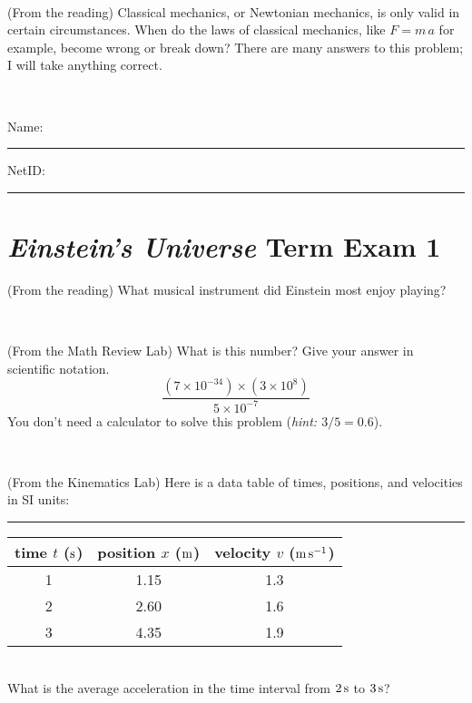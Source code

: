 \documentclass[12pt, letterpaper]{article}
\begin{document}
\vfill ~

\begin{problem} (From the reading)
Classical mechanics, or Newtonian mechanics, is only valid in certain
circumstances. When do the laws of classical mechanics, like $F =
m\,a$ for example, become wrong or break down? There are many answers
to this problem; I will take anything correct.
\end{problem}


\vfill ~


\cleardoublepage



\noindent
Name: \rule[-1ex]{0.60\textwidth}{0.1pt}
NetID: \rule[-1ex]{0.20\textwidth}{0.1pt}

\section*{\textsl{Einstein's Universe} Term Exam 1}
\setcounter{problem}{1}


\begin{problem} (From the reading)
What musical instrument did Einstein most enjoy playing?
\end{problem}


\vfill ~

\begin{problem} (From the Math Review Lab)
What is this number? Give your answer in scientific notation.
$$
\frac{(7\times10^{-34})\times(3\times10^8)}{5\times10^{-7}}
$$
You don't need a calculator to solve this problem (\textit{hint: $3/5=0.6$}).
\end{problem}


\vfill ~

\begin{problem} (From the Kinematics Lab)
Here is a data table of times, positions, and velocities in SI units:\\
\rule{1.0in}{0pt}\begin{tabular}{c|c|c}
time $t$ ($\mathrm{s}$) & position $x$ ($\mathrm{m}$) & velocity $v$ ($\mathrm{m}\,\mathrm{s}^{-1}$) \\
\hline
1 & 1.15 & 1.3 \\
2 & 2.60 & 1.6 \\
3 & 4.35 & 1.9 \\
\hline
\end{tabular}\\
What is the average acceleration in the time interval from $2\,\mathrm{s}$ to $3\,\mathrm{s}$?
\end{problem}


\vfill ~
\end{document}
